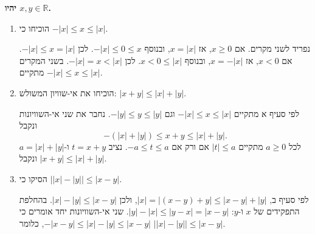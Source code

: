 \textbf{יהיו $x,y\in\mathbb{R}$.}
\begin{enumerate}
\item
הוכיחו כי
$-|x|\le x\le|x|$.
\begin{solbox}
נפריד לשני מקרים.
אם $x\ge0$, אז $x=|x|$, ובנוסף $-|x|\le0\le x$. לכן $-|x|\le x=|x|$.
אם $x<0$, אז $x=-|x|$, ובנוסף $x<0\le|x|$. לכן $-|x|=x<|x|$.
בשני המקרים מתקיים
$-|x|\le x\le|x|$.
\end{solbox}
\item
הוכיחו את אי-שוויון המשולש:
$|x+y|\le|x|+|y|$.
\begin{solbox}
לפי סעיף א מתקיים
$-|x|\le x\le|x|$
וגם
$-|y|\le y\le|y|$.
נחבר את שני אי-השוויונות ונקבל
$$-\left(|x|+|y|\right)\le x+y\le|x|+|y| .$$
לכל $a\ge0$ מתקיים $|t|\le a$ אם ורק אם $-a\le t\le a$. נציב $t=x+y$
ו-$a=|x|+|y|$ ונקבל
$|x+y|\le|x|+|y|$.
\end{solbox}
\item
הסיקו כי
$\bigl||x|-|y|\bigr|\le|x-y|$.
\begin{solbox}
לפי סעיף ב,
$|x|=|(x-y)+y|\le|x-y|+|y|$,
ולכן
$|x|-|y|\le|x-y|$.
בהחלפת התפקידים של $x$ ו-$y$:
$|y|-|x|\le|y-x|=|x-y|$.
שני אי-השוויונות יחד אומרים כי
$-|x-y|\le|x|-|y|\le|x-y|$,
כלומר
$\bigl||x|-|y|\bigr|\le|x-y|$.
\end{solbox}
\end{enumerate}
